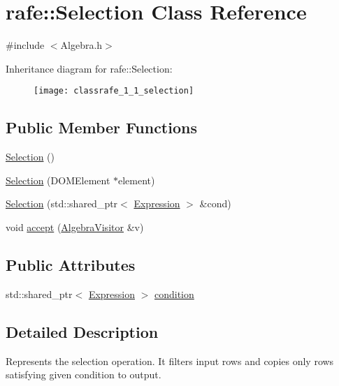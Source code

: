\hypertarget{classrafe_1_1_selection}{\section{rafe\+:\+:Selection Class Reference}
\label{classrafe_1_1_selection}
}


{\ttfamily \#include $<$Algebra.\+h$>$}

Inheritance diagram for rafe\+:\+:Selection\+:\begin{figure}[H]
\begin{center}
\leavevmode
\texttt{[image: classrafe\_1\_1\_selection]}
\end{center}
\end{figure}
\subsection*{Public Member Functions}
\begin{DoxyCompactItemize}
\item 
\hyperlink{classrafe_1_1_selection_a272335b08a2f8a590e922e41ea7cc151}{Selection} ()
\item 
\hyperlink{classrafe_1_1_selection_aa69f2e5072b24749451f34d0444844ce}{Selection} (D\+O\+M\+Element $\ast$element)
\item 
\hyperlink{classrafe_1_1_selection_a6fb6f1e1d896a7465584c798d126c3d9}{Selection} (std\+::shared\+\_\+ptr$<$ \hyperlink{classrafe_1_1_expression}{Expression} $>$ \&cond)
\item 
void \hyperlink{classrafe_1_1_selection_a7304eb319db31a5c8ecb56b33d58e1e3}{accept} (\hyperlink{classrafe_1_1_algebra_visitor}{Algebra\+Visitor} \&v)
\end{DoxyCompactItemize}
\subsection*{Public Attributes}
\begin{DoxyCompactItemize}
\item 
std\+::shared\+\_\+ptr$<$ \hyperlink{classrafe_1_1_expression}{Expression} $>$ \hyperlink{classrafe_1_1_selection_ade262c53a6fdf72acd271ebb36ca394d}{condition}
\end{DoxyCompactItemize}


\subsection{Detailed Description}
Represents the selection operation. It filters input rows and copies only rows satisfying given condition to output. 

